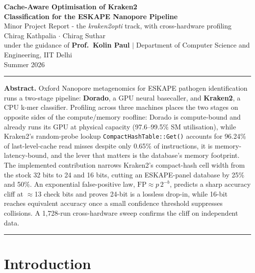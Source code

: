 \documentclass[10.5pt]{article}
\newcommand{\code}[1]{\texttt{\footnotesize #1}}
\begin{document}
\begin{center}
{\LARGE\bfseries Cache-Aware Optimisation of Kraken2\\[0.14cm] Classification for the ESKAPE Nanopore Pipeline}\\[0.35cm]
{\normalsize Minor Project Report - the \textit{kraken2opti} track, with cross-hardware profiling}\\[0.4cm]
{\small Chirag Kathpalia \quad $\cdot$ \quad Chirag Suthar}\\[0.1cm]
{\small under the guidance of \textbf{Prof.\ Kolin Paul} \quad $\vert$ \quad Department of Computer Science and Engineering, IIT Delhi}\\[0.1cm]
{\small Summer 2026}
\end{center}

\vspace{0.25cm}
\noindent\rule{\textwidth}{0.4pt}
\vspace{0.1cm}

{\small\textbf{Abstract.} Oxford Nanopore metagenomics for ESKAPE pathogen identification runs a two-stage pipeline: \textbf{Dorado}, a GPU neural basecaller, and \textbf{Kraken2}, a CPU k-mer classifier. Profiling across three machines places the two stages on opposite sides of the compute/memory roofline: Dorado is compute-bound and already runs its GPU at physical capacity (97.6--99.5\% SM utilisation), while Kraken2's random-probe lookup \code{CompactHashTable::Get()} accounts for 96.24\% of last-level-cache read misses despite only 0.65\% of instructions, it is memory-latency-bound, and the lever that matters is the database's memory footprint. The implemented contribution narrows Kraken2's compact-hash cell width from the stock 32 bits to 24 and 16 bits, cutting an ESKAPE-panel database by 25\% and 50\%. An exponential false-positive law, $\mathrm{FP}\!\approx\!p\,2^{-b}$, predicts a sharp accuracy cliff at $\approx$13 check bits and proves 24-bit is a lossless drop-in, while 16-bit reaches equivalent accuracy once a small confidence threshold suppresses collisions. A 1{,}728-run cross-hardware sweep confirms the cliff on independent data.}

\vspace{0.1cm}
\noindent\rule{\textwidth}{0.4pt}

\section{Introduction}
\end{document}
